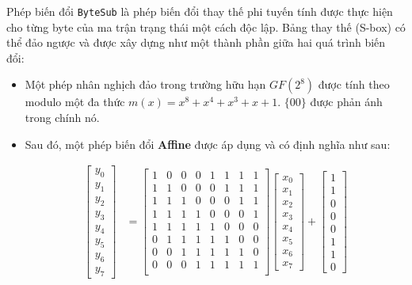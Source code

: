 Phép biến đổi \texttt{ByteSub} là phép biến đổi thay thế phi tuyến tính được thực hiện cho từng byte của ma trận trạng thái một cách độc lập. Bảng thay thế (S-box) có thể đảo ngược và được xây dựng như một thành phần giữa hai quá trình biến đổi:
		\begin{itemize}
	\item Một phép nhân nghịch đảo trong trường hữu hạn $GF(2^8)$ được tính theo modulo một đa thức $m(x) = x^8 + x^4 + x^3 + x + 1$. $\{00\}$ được phản ánh trong chính nó.
	\item Sau đó, một phép biến đổi \textbf{Affine} được áp dụng và có định nghĩa như sau:
	
	\begin{align}
		\begin{bmatrix} 
			y_0\\y_1\\ y_2\\y_3\\y_4\\y_5\\y_6\\y_7
		\end{bmatrix} &= 
		\begin{bmatrix}
			1 & 0 & 0 & 0 & 1 & 1 & 1 & 1\\
			1 & 1 & 0 & 0 & 0 & 1 & 1 & 1\\
			1 & 1 & 1 & 0 & 0 & 0 & 1 & 1\\
			1 & 1 & 1 & 1 & 0 & 0 & 0 & 1\\
			1 & 1 & 1 & 1 & 1 & 0 & 0 & 0\\
			0 & 1 & 1 & 1 & 1 & 1 & 0 & 0\\
			0 & 0 & 1 & 1 & 1 & 1 & 1 & 0\\
			0 & 0 & 0 & 1 & 1 & 1 & 1 & 1\\
		\end{bmatrix}
		\begin{bmatrix} 
			x_0\\x_1\\x_2\\x_3\\x_4\\x_5\\x_6\\x_7
		\end{bmatrix}
		+
		\begin{bmatrix}
			1\\1\\0\\0\\0\\1\\1\\0
		\end{bmatrix}
	\end{align}
	
\end{itemize}

